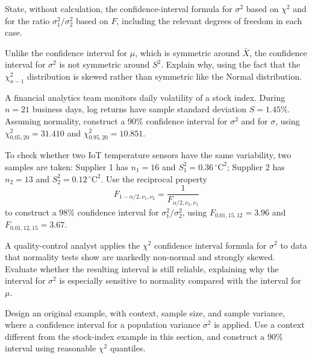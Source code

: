 \begin{problema}\label{prob:05ea7a1}
State, without calculation, the confidence-interval formula for $\sigma^2$ based on $\chi^2$ and for the ratio $\sigma_1^2/\sigma_2^2$ based on $F$, including the relevant degrees of freedom in each case.
\end{problema}

\begin{problema}\label{prob:c70c188}
Unlike the confidence interval for $\mu$, which is symmetric around $\bar X$, the confidence interval for $\sigma^2$ is not symmetric around $S^2$. Explain why, using the fact that the $\chi^2_{n-1}$ distribution is skewed rather than symmetric like the Normal distribution.
\end{problema}

\begin{problema}\label{prob:fa97dc8}
A financial analytics team monitors daily volatility of a stock index. During $n=21$ business days, log returns have sample standard deviation $S=1.45\%$. Assuming normality, construct a $90\%$ confidence interval for $\sigma^2$ and for $\sigma$, using $\chi^2_{0.05,20}=31.410$ and $\chi^2_{0.95,20}=10.851$.
\end{problema}

\begin{problema}\label{prob:33162ae}
To check whether two IoT temperature sensors have the same variability, two samples are taken: Supplier 1 has $n_1=16$ and $S_1^2=0.36\,^\circ\text{C}^2$; Supplier 2 has $n_2=13$ and $S_2^2=0.12\,^\circ\text{C}^2$. Use the reciprocal property
\[
	F_{1-\alpha/2,\nu_1,\nu_2}=\frac{1}{F_{\alpha/2,\nu_2,\nu_1}}
\]
to construct a $98\%$ confidence interval for $\sigma_1^2/\sigma_2^2$, using $F_{0.01,15,12}=3.96$ and $F_{0.01,12,15}=3.67$.
\end{problema}

\begin{problema}\label{prob:6bad87b}
A quality-control analyst applies the $\chi^2$ confidence interval formula for $\sigma^2$ to data that normality tests show are markedly non-normal and strongly skewed. Evaluate whether the resulting interval is still reliable, explaining why the interval for $\sigma^2$ is especially sensitive to normality compared with the interval for $\mu$.
\end{problema}

\begin{problema}\label{prob:866061e}
Design an original example, with context, sample size, and sample variance, where a confidence interval for a population variance $\sigma^2$ is applied. Use a context different from the stock-index example in this section, and construct a $90\%$ interval using reasonable $\chi^2$ quantiles.
\end{problema}

